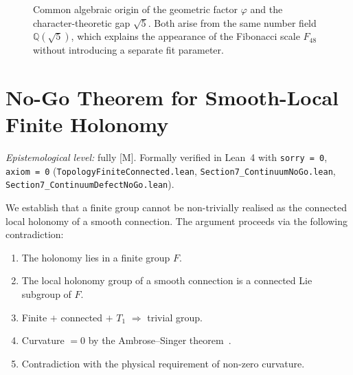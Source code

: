 \documentclass[sn-mathphys-num,Numbered]{sn-jnl}
\theoremstyle{thmstyleone}
\theoremstyle{thmstylethree}
\theoremstyle{thmstyletwo}
\newcommand{\phigold}{\varphi}      %
\newcommand{\etaB}{\eta_{\mathrm{B}}}
\newcommand{\Qsqrt}{\mathbb{Q}(\sqrt{5})}
\begin{document}
\begin{figure}[t]
\caption{Common algebraic origin of the geometric factor $\phigold$ and the
character-theoretic gap $\sqrt{5}$. Both arise from the same number field $\Qsqrt$,
which explains the appearance of the Fibonacci scale $F_{48}$ without introducing a
separate fit parameter.}
\label{fig:qsqrt-unification}
\end{figure}


\section{No-Go Theorem for Smooth-Local Finite Holonomy}
\label{sec:nogo}

\medskip
\noindent\textit{Epistemological level:} fully [M].
Formally verified in Lean~4 with \texttt{sorry = 0}, \texttt{axiom = 0}
(\texttt{TopologyFiniteConnected.lean}, \texttt{Section7\_ContinuumNoGo.lean},
\texttt{Section7\_ContinuumDefectNoGo.lean}).
\medskip


We establish that a finite group cannot be non-trivially realised as
the connected local holonomy of a smooth connection. The argument
proceeds via the following contradiction:
\begin{enumerate}
  \item[(i)] The holonomy lies in a finite group $F$.
  \item[(ii)] The local holonomy group of a smooth connection is a
    connected Lie subgroup of $F$.
  \item[(iii)] Finite $+$ connected $+$ $T_1$ $\Rightarrow$ trivial
    group.
  \item[(iv)] Curvature $= 0$ by the Ambrose--Singer theorem~\cite{AS1953}.
  \item[(v)] Contradiction with the physical requirement of non-zero
    curvature.
\end{enumerate}
\end{document}

